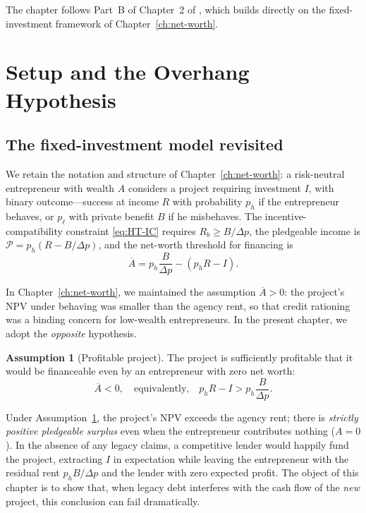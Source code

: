 \documentclass[11pt,a4paper,oneside]{book}
\def\geq{\geqslant}
\theoremstyle{plain}
\theoremstyle{definition}
\newtheorem{assumption}[theorem]{Assumption}
\theoremstyle{remark}
\numberwithin{equation}{chapter}
\begin{document}
The chapter follows Part~B of Chapter~2 of \citet{Tirole2006}, which builds directly on the fixed-investment framework of Chapter~\ref{ch:net-worth}.

\section{Setup and the Overhang Hypothesis}
\label{sec:DO-setup}

\subsection{The fixed-investment model revisited}

We retain the notation and structure of Chapter~\ref{ch:net-worth}: a risk-neutral entrepreneur with wealth $A$ considers a project requiring investment $I$, with binary outcome---success at income $R$ with probability $p_h$ if the entrepreneur behaves, or $p_\ell$ with private benefit $B$ if he misbehaves.
The incentive-compatibility constraint \eqref{eq:HT-IC} requires $R_b \geq B/\Delta p$, the pledgeable income is $\mathcal{P} = p_h(R - B/\Delta p)$, and the net-worth threshold for financing is
\begin{equation*}
  \overline{A} = p_h \frac{B}{\Delta p} - (p_h R - I).
\end{equation*}

In Chapter~\ref{ch:net-worth}, we maintained the assumption $\overline{A} > 0$: the project's NPV under behaving was smaller than the agency rent, so that credit rationing was a binding concern for low-wealth entrepreneurs.
In the present chapter, we adopt the \emph{opposite} hypothesis.

\begin{assumption}[Profitable project]\label{ass:DO-profitable}
The project is sufficiently profitable that it would be financeable even by an entrepreneur with zero net worth:
\begin{equation}\label{eq:DO-profitable}
  \overline{A} < 0,
  \quad \text{equivalently,} \quad
  p_h R - I > p_h \frac{B}{\Delta p}.
\end{equation}
\end{assumption}

Under Assumption~\ref{ass:DO-profitable}, the project's NPV exceeds the agency rent; there is \emph{strictly positive pledgeable surplus} even when the entrepreneur contributes nothing ($A = 0$).
In the absence of any legacy claims, a competitive lender would happily fund the project, extracting $I$ in expectation while leaving the entrepreneur with the residual rent $p_h B / \Delta p$ and the lender with zero expected profit.
The object of this chapter is to show that, when legacy debt interferes with the cash flow of the \emph{new} project, this conclusion can fail dramatically.
\end{document}

